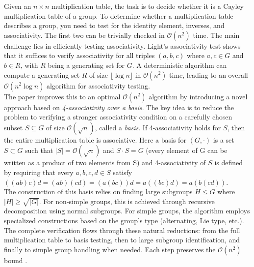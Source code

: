 
Given an \(n \times n\) multiplication table, the task is to decide whether it is a Cayley multiplication table of a group. To determine whether a multiplication table describes a group, you need to test for the identity element, inverses, and associativity. The first two can be trivially checked in \(\mathcal{O}(n^2)\) time. The main challenge lies in efficiently testing associativity. Light's associativity test shows that it suffices to verify associativity for all triples \((a, b, c)\) where \(a, c \in G\) and \(b \in R\), with \(R\) being a generating set for \(G\). A deterministic algorithm can compute a generating set \(R\) of size \(\lfloor \log n \rfloor\) in \(\mathcal{O}(n^2)\) time, leading to an overall \(\mathcal{O}(n^2 \log n)\) algorithm for associativity testing. 
\\
The paper improves this to an optimal \(\mathcal{O}(n^2)\) algorithm by introducing a novel approach based on \emph{4-associativity over a basis}. The key idea is to reduce the problem to verifying a stronger associativity condition on a carefully chosen subset \(S \subseteq G\) of size \(\mathcal{O}(\sqrt{n})\), called a \emph{basis}. If 4-associativity holds for \(S\), then the entire multiplication table is associative. Here a basis for \((G, \cdot)\) is a set \(S \subset G\) such that \(|S| = \mathcal{O}(\sqrt{n})\) and \(S \cdot S = G\) (every element of G can be written as a product of two elements from S) and 4-associativity of \(S\) is defined by requiring that every \(a, b, c, d \in S\) satisfy \(((ab)c)d = (ab)(cd) = (a(bc))d = a((bc)d) = a(b(cd))\).
\\
The construction of this basis relies on finding large subgroups \(H \leq G\) where \(|H| \geq \sqrt{|G|}\). For non-simple groups, this is achieved through recursive decomposition using normal subgroups. For simple groups, the algorithm employs specialized constructions based on the group's type (alternating, Lie type, etc.).
The complete verification flows through these natural reductions: from the full multiplication table to basis testing, then to large subgroup identification, and finally to simple group handling when needed. Each step preserves the \(\mathcal{O}(n^2)\) bound \cite{10756141}. 